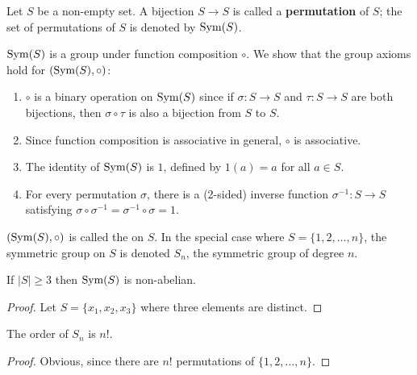 \begin{example}
Let $S$ be a non-empty set. A bijection $S\to S$ is called a \textbf{permutation} of $S$; the set of permutations of $S$ is denoted by $\operatorname{Sym}(S)$.

$\operatorname{Sym}(S)$ is a group under function composition $\circ$. We show that the group axioms hold for $(\operatorname{Sym}(S),\circ)$:
\begin{enumerate}[label=(\roman*)]
\item $\circ$ is a binary operation on $\operatorname{Sym}(S)$ since if $\sigma:S\to S$ and $\tau:S\to S$ are both bijections, then $\sigma\circ\tau$ is also a bijection from $S$ to $S$.
\item Since function composition is associative in general, $\circ$ is associative.
\item The identity of $\operatorname{Sym}(S)$ is $1$, defined by $1(a)=a$ for all $a\in S$.
\item For every permutation $\sigma$, there is a (2-sided) inverse function $\sigma^{-1}:S\to S$ satisfying $\sigma\circ\sigma^{-1}=\sigma^{-1}\circ\sigma=1$.
\end{enumerate}

$(\operatorname{Sym}(S),\circ)$ is called the  on $S$. In the special case where $S=\{1,2,\dots,n\}$, the symmetric group on $S$ is denoted $S_n$, the symmetric group of degree $n$.

\begin{proposition}
If $|S|\ge3$ then $\operatorname{Sym}(S)$ is non-abelian.
\end{proposition}

\begin{proof}
Let $S=\{x_1,x_2,x_3\}$ where three elements are distinct.
\end{proof}

\begin{proposition}
The order of $S_n$ is $n!$.
\end{proposition}

\begin{proof}
Obvious, since there are $n!$ permutations of $\{1,2,\dots,n\}$.
\end{proof}
\end{example}

